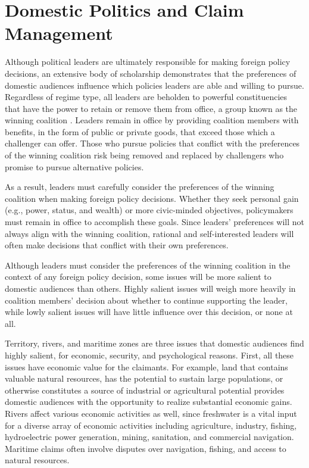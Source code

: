 \section{Domestic Politics and Claim Management}


Although political leaders are ultimately responsible for making foreign policy decisions, an extensive body of scholarship demonstrates that the preferences of domestic audiences influence which policies leaders are able and willing to pursue. Regardless of regime type, all leaders are beholden to powerful constituencies that have the power to retain or remove them from office, a group known as the winning coalition \citep{bdm2003}. Leaders remain in office by providing coalition members with benefits, in the form of public or private goods, that exceed those which a challenger can offer. Those who pursue policies that conflict with the preferences of the winning coalition risk being removed and replaced by challengers who promise to pursue alternative policies.

As a result, leaders must carefully consider the preferences of the winning coalition when making foreign policy decisions. Whether they seek personal gain (e.g., power, status, and wealth) or more civic-minded objectives, policymakers must remain in office to accomplish these goals. Since leaders’ preferences will not always align with the winning coalition, rational and self-interested leaders will often make decisions that conflict with their own preferences.  

Although leaders must consider the preferences of the winning coalition in the context of any foreign policy decision, some issues will be more salient to domestic audiences than others. Highly salient issues will weigh more heavily in coalition members' decision about whether to continue supporting the leader, while lowly salient issues will have little influence over this decision, or none at all.


Territory, rivers, and maritime zones are three issues that domestic audiences find highly salient, for economic, security, and psychological reasons. First, all these issues have economic value for the claimants. For example, land that contains valuable natural resources, has the potential to sustain large populations, or otherwise constitutes a source of industrial or agricultural potential provides domestic audiences with the opportunity to realize substantial economic gains. Rivers affect various economic activities as well, since freshwater is a vital input for a diverse array of economic activities including agriculture, industry, fishing, hydroelectric power generation, mining, sanitation, and commercial navigation. Maritime claims often involve disputes over navigation, fishing, and access to natural resources.

